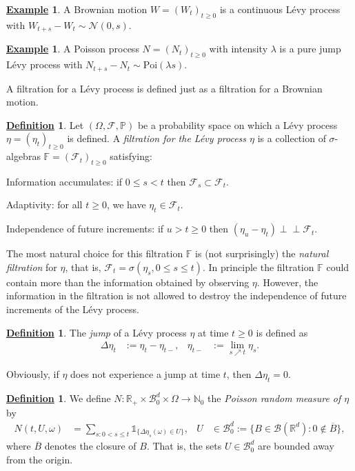 \documentclass[12pt]{book}
\numberwithin{equation}{chapter}
\theoremstyle{plain}
\numberwithin{theorem}{section}
\theoremstyle{definition}
\newtheorem{definition}[theorem]{\underline{Definition}}
\newtheorem{example}[theorem]{\underline{Example}}
\numberwithin{exercise}{chapter}
\newcommand{\<}{\langle}
\renewcommand{\>}{\rangle}
\renewcommand{\(}{\left(}
\renewcommand{\)}{\right)}
\renewcommand{\[}{\left[}
\renewcommand{\]}{\right]}
\newcommand\Fb{\mathds{F}}
\newcommand\Ib{\mathds{1}} 	%
\newcommand\Pb{\mathds{P}}
\newcommand\Rb{\mathds{R}}
\newcommand\Nb{\mathds{N}}
\newcommand\Bc{\mathscr{B}}
\newcommand\Fc{\mathscr{F}}
\newcommand\Nc{\mathscr{N}}
\newcommand\om{\omega}
\newcommand\Om{\Omega}
\newcommand\sig{\sigma}
\newcommand\lam{\lambda}
\newcommand\Del{\Delta}
\newcommand{\ind}{\perp \! \! \! \perp}
\begin{document}
\begin{example}
A Brownian motion $W = (W_t)_{t \geq 0}$ is a continuous L\'evy process with $W_{t+s}-W_t \sim \Nc(0,s)$.
\end{example}

\begin{example}
A Poisson process $N = (N_t)_{t \geq 0}$ with intensity $\lam$ is a pure jump L\'evy process with $N_{t+s}-N_t \sim \text{Poi}(\lam s)$.
\end{example}

\noindent
A filtration for a L\'evy process is defined just as a filtration for a Brownian motion.

\begin{definition}
\label{def:levy.filtration}
Let $(\Om, \Fc, \Pb)$ be a probability space on which a L\'evy process $\eta=(\eta_t)_{t \geq 0}$ is defined.  A \emph{filtration for the L\'evy process $\eta$} is a collection of $\sig$-algebras $\Fb=(\Fc_t)_{t \geq 0}$ satisfying:
\begin{enumerate*}
\item Information accumulates: if $0 \leq s < t$ then $\Fc_s \subset \Fc_t$.
\item Adaptivity: for all $t \geq 0$, we have $\eta_t \in \Fc_t$.
\item Independence of future increments: if $u>t \geq 0$ then $(\eta_u - \eta_t) \ind \Fc_t$.
\end{enumerate*}
\end{definition}

\noindent
The most natural choice for this filtration $\Fb$ is (not surprisingly) the \emph{natural filtration} for $\eta$, that is, $\Fc_t = \sig(\eta_s,0\leq s \leq t)$.  In principle the filtration $\Fb$ could contain more than the information obtained by observing $\eta$.  However, the information in the filtration is not allowed to destroy the independence of future increments of the L\'evy process.


\begin{definition}
The \emph{jump} of a L\'evy process $\eta$ at time $t \geq 0$ is defined as
\begin{align}
\Del \eta_t
	&:=	\eta_t - \eta_{t-} , &
\eta_{t-}
	&:=	\lim_{s \nearrow t} \eta_s .
\end{align}
\end{definition}

\noindent
Obviously, if $\eta$ does not experience a jump at time $t$, then $\Del \eta_t = 0$.

\begin{definition}
We define $N: \Rb_+ \times \Bc_0^d \times \Om \to \Nb_0$ the \emph{Poisson random measure of $\eta$} by
\begin{align}
N(t,U,\om)
	&=	\sum_{s:0 < s \leq t} \Ib_{\{ \Del \eta_s(\om) \in U \}} , &
U
	&\in \Bc_0^d := \{ B \in \Bc(\Rb^d) : 0 \notin \overline{B} \} ,
\end{align}
where $\overline{B}$ denotes the closure of $B$.  That is, the sets $U \in \Bc_0^d$ are bounded away from the origin.
\end{definition}
\end{document}
